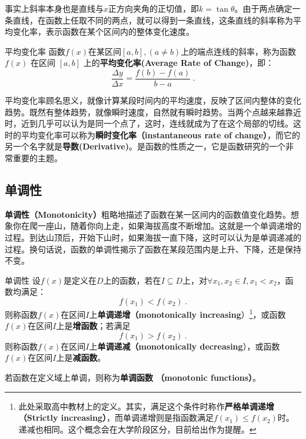 事实上斜率本身也是直线与$x$正方向夹角的正切值，即$k=\tan\theta$。由于两点确定一条直线，在函数上任取不同的两点，就可以得到一条直线，这条直线的斜率称为平均变化率，表示函数在某个区间内的整体变化速度。

\begin{definition}{平均变化率}\label{def_HsFunC_3}
函数$f(x)$在某区间$[a, b],(a\neq b)$上的端点连线的斜率，称为函数 $f(x)$ 在区间 $[a, b]$ 上的\textbf{平均变化率(Average Rate of Change)}，即：
\begin{equation}
\frac{\Delta y}{\Delta x}=\frac{f(b) - f(a)}{b - a}~.
\end{equation}
\end{definition}

平均变化率顾名思义，就像计算某段时间内的平均速度，反映了区间内整体的变化趋势。既然有整体趋势，就像瞬时速度，自然就有瞬时趋势。当两个点越来越靠近时，近到几乎可以认为是同一个点了，这时，连线就成为了在这个局部的切线。这时的平均变化率可以称为\textbf{瞬时变化率（instantaneous rate of change）}，而它的另一个名字就是\textbf{导数(Derivative)}。是函数的性质之一，它是函数研究的一个非常重要的主题。

\subsection{单调性}\label{sub_HsFunC_1}

\textbf{单调性（Monotonicity）}粗略地描述了函数在某一区间内的函数值变化趋势。想象你在爬一座山，随着你向上走，如果海拔高度不断增加。这就是一个单调递增的过程。到达山顶后，开始下山时，如果海拔一直下降，这时可以认为是单调递减的过程。换句话说，函数的单调性揭示了函数在某段范围内是上升、下降，还是保持不变。

\begin{definition}{单调性}\label{def_HsFunC_1}
设$f(x)$是定义在$D$上的函数，若在$I\subseteq D$上，对$\forall x_1,x_2\in I,x_1< x_2$，函数均满足：
\begin{equation}
f(x_1)<f(x_2)~.
\end{equation}
则称函数$f(x)$在区间$I$上\textbf{单调递增（monotonically increasing}）\footnote{此处采取高中教材上的定义。其实，满足这个条件时称作\textbf{严格单调递增 （Strictly increasing）}，而单调递增则是指函数满足$f(x_1)\leq f(x_2)$时。递减也相同。这个概念会在大学阶段区分，目前给出作为提醒。}，或函数$f(x)$在区间$I$上是\textbf{增函数}；若满足
\begin{equation}
f(x_1)>f(x_2)~.
\end{equation}
则称函数$f(x)$在区间$I$上\textbf{单调递减（monotonically decreasing}），或函数$f(x)$在区间$I$上是\textbf{减函数}。

若函数在定义域上单调，则称为\textbf{单调函数 （monotonic functions）}。
\end{definition}

